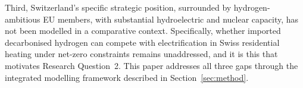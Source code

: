 Third, Switzerland's specific strategic position, surrounded by
hydrogen-ambitious EU members, with substantial hydroelectric and nuclear
capacity, has not been modelled in a comparative context. Specifically, whether
imported decarbonised hydrogen can compete with electrification in Swiss
residential heating under net-zero constraints remains unaddressed, and it is this
that motivates Research Question~2. This paper
addresses all three gaps through the integrated modelling framework described in
Section~\ref{sec:method}.
